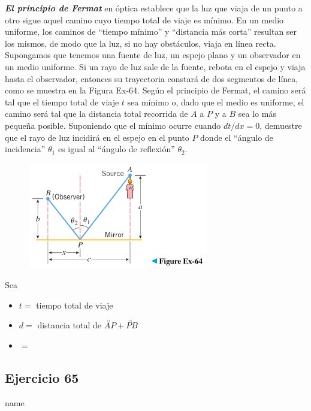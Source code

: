 \documentclass[12pt]{article}
\begin{document}
\textit{\textbf{El principio de Fermat}} en óptica establece que la luz que viaja de un punto a otro sigue aquel camino cuyo tiempo total de viaje es mínimo. En un medio uniforme, los caminos de ``tiempo mínimo'' y ``distancia más corta'' resultan ser los mismos, de modo que la luz, si no hay obstáculos, viaja en línea recta. Supongamos que tenemos una fuente de luz, un espejo plano y un observador en un medio uniforme. Si un rayo de luz sale de la fuente, rebota en el espejo y viaja hasta el observador, entonces su trayectoria constará de dos segmentos de línea, como se muestra en la Figura Ex-64. Según el principio de Fermat, el camino será tal que el tiempo total de viaje $t$ sea mínimo o, dado que el medio es uniforme, el camino será tal que la distancia total recorrida de $A$ a $P$ y a $B$ sea lo más pequeña posible. Suponiendo que el mínimo ocurre cuando $dt/dx = 0$, demuestre que el rayo de luz incidirá en el espejo en el punto $P$ donde el ``ángulo de incidencia'' $\theta_1$ es igual al ``ángulo de reflexión'' $\theta_2$.
\begin{figure}[H]
\centering
\includegraphics[width=0.7\textwidth]{../img/img_Lista3/3_64.png}
\end{figure}

Sea
\begin{itemize}
\item $t= $ tiempo total de viaje
\item $d= $ distancia total de $\overleftrightarrow{AP}+\overleftrightarrow{PB}$
\item $= $ 
\end{itemize}

\subsection{Ejercicio 65} name \\
\end{document}

